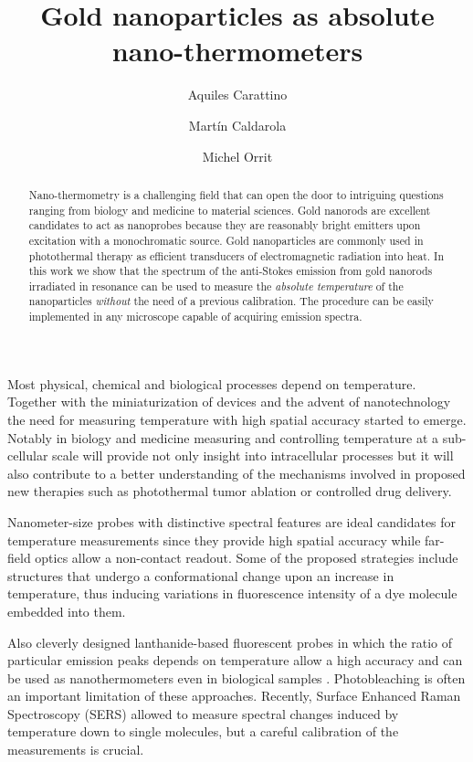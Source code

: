 \documentclass[journal=nalefd,manuscript=letter]{achemso}
\author{Aquiles Carattino}
\affiliation[Leiden]
{Huygens-Kamerlingh Onnes Lab, 2300RA Leiden, The Netherlands}
\author{Mart\'in Caldarola}
\affiliation[Leiden]
{Huygens-Kamerlingh Onnes Lab, 2300RA Leiden, The Netherlands}
\author{Michel Orrit}
\affiliation[Leiden]
{Huygens-Kamerlingh Onnes Lab, 2300RA Leiden, The Netherlands}
\title{Gold nanoparticles as absolute nano-thermometers}
\begin{document}
\maketitle

\begin{abstract}
Nano-thermometry is a challenging field that can open the door
to intriguing questions ranging from biology and medicine to material sciences.
Gold nanorods are excellent candidates to act as nanoprobes because they are
reasonably bright emitters upon excitation with a monochromatic source.
Gold nanoparticles are commonly used in photothermal therapy as efficient
transducers of electromagnetic radiation into heat. In this work we show that
the spectrum of the anti-Stokes emission from gold nanorods irradiated in
resonance can be used to measure the \textit{absolute temperature} of the nanoparticles 
\textit{without} the need of a previous calibration.
The procedure can be easily implemented in any microscope capable of acquiring emission spectra. 

\end{abstract}


Most physical, chemical and biological processes depend on
temperature. Together with the miniaturization of devices and the advent of
nanotechnology the need for measuring temperature with high spatial accuracy
started to emerge. Notably in biology\cite{Yang2011a,Hrelescu2010} and
medicine\cite{Li2013c} measuring and controlling temperature at a sub-cellular scale
will provide not only insight into intracellular processes but it will
also contribute to a better understanding of the mechanisms involved in proposed
new therapies such as photothermal tumor ablation\cite{Gobin2007} or controlled
drug delivery\cite{Huang2006,Huo2014}.

Nanometer-size probes with distinctive spectral features are ideal candidates
for temperature measurements since they provide high spatial accuracy while
far-field optics allow a non-contact readout. Some of the proposed strategies
include structures that undergo a conformational change upon an increase in
temperature\cite{Ebrahimi2014}, thus inducing variations in fluorescence
intensity of a dye molecule embedded into them.

Also cleverly designed lanthanide-based fluorescent probes in which the ratio of
particular emission peaks depends on temperature allow a high accuracy and can
be used as nanothermometers \cite{liu2016ratiometric} even in biological samples
\cite{Vetrone2010}. Photobleaching is often an important limitation of these
approaches. Recently, Surface Enhanced Raman Spectroscopy (SERS) allowed to
measure spectral changes induced by temperature down to single
molecules\cite{Pozzi2015}, but a careful calibration of the measurements is
crucial.
\end{document}
